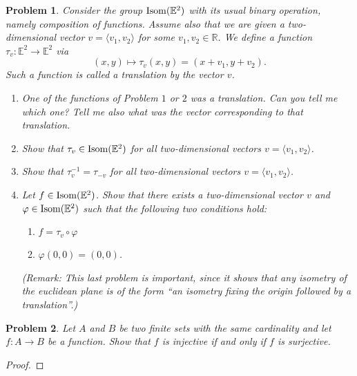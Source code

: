 \documentclass[reqno]{amsart}
\theoremstyle{plain}
\newtheorem{problem}{Problem}
\theoremstyle{definition}
\begin{document}
\begin{problem}
Consider the group ${\rm Isom}(\mathbb{E}^{2})$ with its usual binary operation, namely composition of functions.  Assume also that we are given a two-dimensional vector $v = \langle v_{1}, v_{2} \rangle$ for some $v_{1}, v_{2} \in \mathbb{R}$.  We define a function $\tau_{v}:\mathbb{E}^{2} \longrightarrow \mathbb{E}^{2}$ via
$$(x,y) \mapsto \tau_{v}(x,y) = (x + v_{1},y+v_{2}). $$
Such a function is called a \emph{translation} by the vector $v$.
\begin{enumerate}
\item One of the functions of Problem $1$ or $2$ was a translation.  Can you tell me which one?  Tell me also what was the vector corresponding to that translation.
\item Show that $\tau_{v} \in {\rm Isom}(\mathbb{E}^{2})$ for all two-dimensional vectors $v = \langle v_{1}, v_{2}\rangle$.
\item Show that $\tau_{v}^{-1} = \tau_{-v}$ for all two-dimensional vectors $v = \langle v_{1}, v_{2}\rangle$.
\item Let $f \in {\rm Isom}(\mathbb{E}^{2})$.  Show that there exists a two-dimensional vector $v$ and $\varphi \in {\rm Isom}(\mathbb{E}^{2})$ such that the following two conditions hold:
\begin{enumerate}
\item $f = \tau_{v} \circ \varphi$
\item $\varphi(0,0) = (0,0)$.
\end{enumerate}
(Remark:  This last problem is important, since it shows that any isometry of the euclidean plane is of the form ``an isometry fixing the origin followed by a translation''.)
\end{enumerate}
\end{problem}

\begin{problem}
Let $A$ and $B$ be two finite sets with the same cardinality and let $f:A \longrightarrow B$ be a function.  Show that $f$ is injective if and only if $f$ is surjective.
\end{problem}
\begin{proof}

\end{proof}
\end{document}
